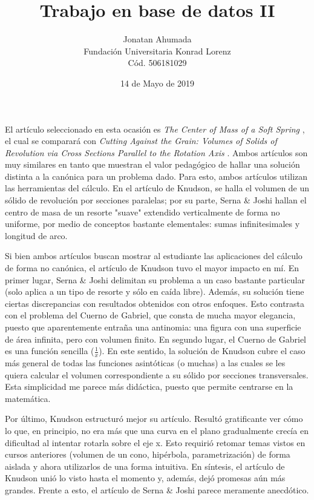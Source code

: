 \documentclass[11pt]{article}
\author{Jonatan Ahumada\\
Fundación Universitaria Konrad Lorenz\\
Cód. 506181029}
\date{14 de Mayo de 2019}
\title{Trabajo en base de datos II \\
}
\begin{document}
\maketitle
\section{}
El artículo seleccionado en esta ocasión es \emph{The Center of Mass of a Soft Spring} \cite{serna}, el cual 
se comparará con \emph{Cutting Against the Grain: Volumes of Solids of Revolution via Cross Sections Parallel to the Rotation Axis} \cite{knudson}.
Ambos artículos son muy similares en tanto que muestran el valor pedagógico de hallar una solución distinta a la canónica para un problema dado.
 Para esto, ambos artículos utilizan las herramientas del cálculo. En el artículo de Knudson, se halla el volumen de un sólido
de revolución por secciones paralelas; por su parte, Serna \& Joshi hallan el centro de masa de un resorte "suave" extendido
verticalmente de forma no uniforme, por medio de conceptos bastante elementales: sumas infinitesimales y longitud de arco. 

Si bien ambos artículos buscan mostrar al estudiante las aplicaciones del cálculo de forma no canónica, el artículo de Knudson
tuvo el mayor impacto en mí. En primer lugar, Serna \& Joshi delimitan su problema a un caso bastante particular (solo aplica a un tipo de resorte y sólo en caída libre). Además, su solución tiene ciertas
discrepancias con resultados obtenidos con otros enfoques. Esto contrasta con el problema del Cuerno de Gabriel,
que consta de mucha mayor elegancia, puesto que aparentemente entraña una antinomia: una figura con una superficie de área infinita, pero con
volumen finito. En segundo lugar, el Cuerno de Gabriel es una función sencilla ($\frac{1}{x}$). En este sentido, la solución de Knudson
cubre el caso más general de todas  las funciones asintóticas (o muchas) a las cuales se les quiera calcular el volumen correspondiente a su sólido
por secciones transversales. Esta simplicidad me parece más didáctica, puesto que permite centrarse en la matemática. 

Por último, Knudson estructuró mejor su artículo. Resultó gratificante ver cómo
 lo que, en principio, no era más que una curva en el plano gradualmente crecía en dificultad al intentar rotarla sobre el eje x.
Esto requirió retomar temas vistos en cursos anteriores (volumen de un cono, hipérbola, parametrización) de forma aislada y
ahora utilizarlos de una forma intuitiva. En síntesis, el artículo de Knudson unió lo visto hasta el momento y, además, dejó 
promesas aún más grandes. Frente a esto, el artículo de Serna \& Joshi parece meramente anecdótico.  


\end{document}
